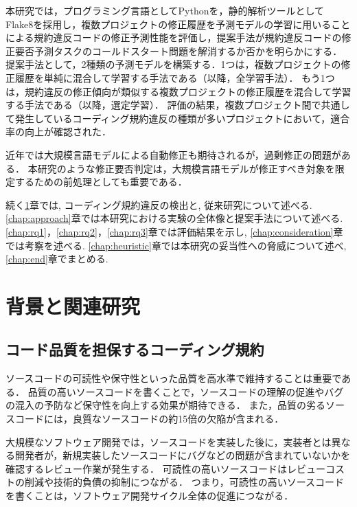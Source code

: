 \documentclass[11pt]{jreport}
\newcommand{\todo}[1]{\colorbox{yellow}{{\bf TODO}:}{\color{red} {\textbf{[#1]}}}}
\begin{document}
本研究では，プログラミング言語としてPythonを，静的解析ツールとしてFlake8を採用し，複数プロジェクトの修正履歴を予測モデルの学習に用いることによる規約違反コードの修正予測性能を評価し，提案手法が規約違反コードの修正要否予測タスクのコールドスタート問題を解消するか否かを明らかにする．
提案手法として，2種類の予測モデルを構築する．1つは，複数プロジェクトの修正履歴を単純に混合して学習する手法である（以降，全学習手法）．
もう1つは，規約違反の修正傾向が類似する複数プロジェクトの修正履歴を混合して学習する手法である（以降，選定学習）．
評価の結果，複数プロジェクト間で共通して発生しているコーディング規約違反の種類が多いプロジェクトにおいて，適合率の向上が確認された．%

近年では大規模言語モデルによる自動修正も期待されるが，過剰修正の問題がある\cite{LLMで自動修正}．
本研究のような修正要否判定は，大規模言語モデルが修正すべき対象を限定するための前処理としても重要である．

続く\ref{chap:background}章では, コーディング規約違反の検出と, 従来研究について述べる. \ref{chap:approach}章では本研究における実験の全体像と提案手法について述べる. \ref{chap:rq1}，\ref{chap:rq2}，\ref{chap:rq3}章では評価結果を示し, \ref{chap:consideration}章では考察を述べる. \ref{chap:heuristic}章では本研究の妥当性への脅威について述べ, \ref{chap:end}章でまとめる.

\chapter{背景と関連研究}\label{chap:background}



\section{コード品質を担保するコーディング規約}

ソースコードの可読性や保守性といった品質を高水準で維持することは重要である．
品質の高いソースコードを書くことで，ソースコードの理解の促進やバグの混入の予防など保守性を向上する効果が期待できる．
また，品質の劣るソースコードには，良質なソースコードの約15倍の欠陥が含まれる\cite{コード品質の重要性}．

大規模なソフトウェア開発では，ソースコードを実装した後に，実装者とは異なる開発者が，新規実装したソースコードにバグなどの問題が含まれていないかを確認するレビュー作業が発生する．
可読性の高いソースコードはレビューコストの削減や技術的負債の抑制につながる\cite{コード品質とレビュー}．
つまり，可読性の高いソースコードを書くことは，ソフトウェア開発サイクル全体の促進につながる．
\end{document}
